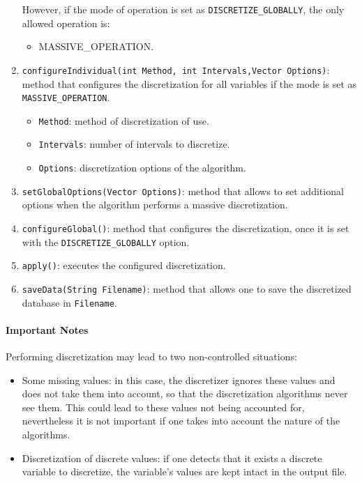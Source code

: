 \begin{enumerate}
			However, if the mode of operation is set as \texttt{DISCRETIZE\_GLOBALLY}, the only allowed operation is:
			\begin{itemize}
				\item	MASSIVE\_OPERATION.
			\end{itemize}
	\item	\verb=configureIndividual(int Method, int Intervals,Vector Options)=: method that configures the discretization
		 	for all variables if the mode is set as \texttt{MASSIVE\_OPERATION}.
			\begin{itemize}
				\item	\verb=Method=: method of discretization of use.
				\item	\verb=Intervals=: number of intervals to discretize.
				\item	\verb=Options=: discretization options of the algorithm.
			\end{itemize}
	\item	\verb=setGlobalOptions(Vector Options)=: method that allows to set additional options when the algorithm
			performs a massive discretization.
	\item	\verb=configureGlobal()=: method that configures the discretization, once it is set with 
			the \texttt{DISCRETIZE\_GLOBALLY} option.
	\item	\verb=apply()=: executes the configured discretization.
	\item	\verb=saveData(String Filename)=: method that allows one to save the discretized database in \verb=Filename=.
\end{enumerate}

\paragraph{Important Notes}
Performing discretization may lead to two non-controlled situations:
\begin{itemize}
	\item	Some missing values: in this case, the discretizer ignores these values and does not take
			them into account, so that the discretization algorithms never see them. This could lead to these
			values not being accounted for, nevertheless it is not important if one takes into account the
			nature of the algorithms.
	\item	Discretization of discrete values: if one detects that it exists a discrete variable to discretize,
			the variable's values are kept intact in the output file.
\end{itemize}

